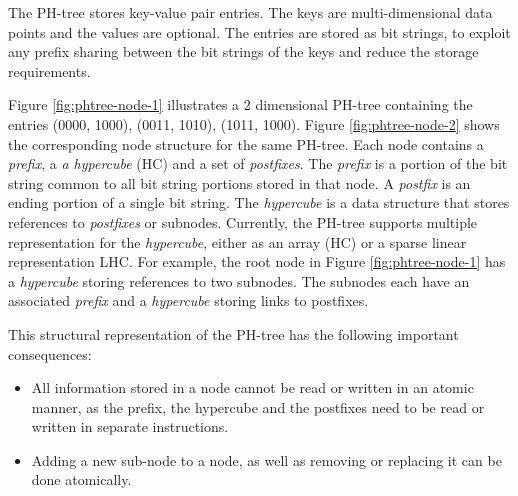 \documentclass[11pt,a4paper]{globis-book}
\begin{document}
The PH-tree stores key-value pair entries. The keys are multi-dimensional data points and the values are optional. The entries are stored as bit strings, to exploit any prefix sharing between the bit strings of the keys and reduce the storage requirements. 

Figure \ref{fig:phtree-node-1} illustrates a 2 dimensional PH-tree containing  the entries (0000, 1000), (0011, 1010), (1011, 1000). Figure \ref{fig:phtree-node-2} shows the corresponding node structure for the same PH-tree. Each node contains a \textit{prefix}, a \textit{a hypercube} (HC) and a set of \textit{postfixes}. The \textit{prefix} is a portion of the bit string common to all bit string portions stored in that node. A \textit{postfix} is an ending portion of a single bit string. The \textit{hypercube} is a data structure that stores references to \textit{postfixes} or subnodes. Currently, the PH-tree supports multiple representation for the \textit{hypercube}, either as an array (HC) or a sparse linear representation {LHC}. For example, the root node in Figure \ref{fig:phtree-node-1} has a \textit{hypercube} storing references to two subnodes. The subnodes each have an associated \textit{prefix} and a \textit{hypercube} storing links to postfixes. 

This structural representation of the PH-tree has the following important consequences:
\begin{itemize}
    \item All information stored in a node cannot be read or written in an atomic manner, as the prefix, the hypercube and the postfixes need to be read or written in separate instructions. 
    \item Adding a new sub-node to a node, as well as removing or replacing it can be done atomically.      
\end{itemize} 
\end{document}
